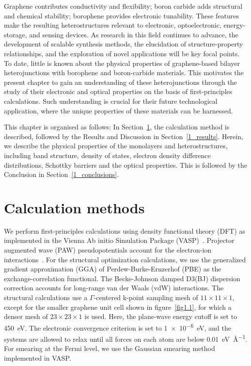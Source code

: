 Graphene contributes conductivity and flexibility; boron carbide adds structural and chemical stability; borophene provides electronic tunability.
These features make the resulting heterostructures relevant to electronic, optoelectronic, energy-storage, and sensing devices.
As research in this field continues to advance,
the development of scalable synthesis methods, the elucidation of structure-property relationships,
and the exploration of novel applications will be key focal points.
To date, little is known about the physical properties of graphene-based bilayer heterojunctions with borophene and boron-carbide materials.
This motivates the present chapter to gain an understanding of these heterojunctions
through the study of their electronic and optical properties on the basis of first-principles calculations.
Such understanding is crucial for their future technological application,
where the unique properties of these materials can be harnessed.

This chapter is organised as follows:
In Section~\ref{1_calculation_methods}, the calculation method is described,
followed by the Results and Discussion in Section~\ref{1_results}.
Herein, we describe the physical properties of the monolayers and heterostructures, including band structure, density of states, electron density difference distributions,
Schottky barriers and the optical properties.
This is followed by the Conclusion in Section~\ref{1_conclusions}.

\section{Calculation methods}
\label{1_calculation_methods}

We perform first-principles calculations using density functional theory (DFT) as implemented in the Vienna Ab initio Simulation Package (VASP)~\cite{kresse1993ab, kresse1996efficiency, kresse1996efficient}.
Projector augmented wave (PAW) pseudopotentials account for the electron-ion interactions~\cite{kresse1999ultrasoft}.
For the structural optimization calculations, we use the generalized gradient approximation (GGA) of Perdew-Burke-Ernzerhof (PBE) as the exchange-correlation functional.
The Becke-Johnson damped D3(BJ) dispersion correction accounts for long-range van der Waals (vdW) interactions.
The structural calculations use a $\Gamma$-centered k-point sampling mesh of $11 \times 11 \times 1$, except for the smaller graphene unit cell shown in figure~\ref{fig1.1}, for which a denser mesh of $23 \times 23 \times 1$ is used.
Here, the plane-wave energy cutoff is set to \qty{450}{\electronvolt}.
The electronic convergence criterion is set to \qty{1e-6}{\electronvolt}, and the systems are allowed to relax until all forces on each atom are below \qty{0.01}{\electronvolt\per\angstrom}.
For smearing at the Fermi level,
we use the Gaussian smearing method implemented in VASP.

